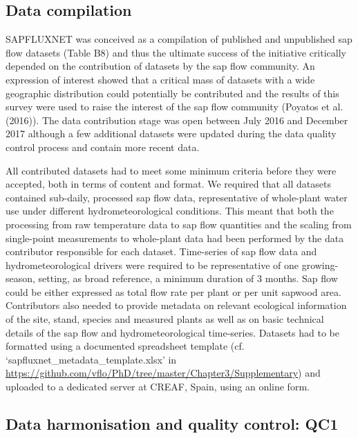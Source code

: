 \documentclass[11pt,twoside]{reedthesis}
\begin{document}
\subsection{Data compilation}\label{data-compilation}

SAPFLUXNET was conceived as a compilation of published and unpublished
sap flow datasets (Table B8) and thus the ultimate success of the
initiative critically depended on the contribution of datasets by the
sap flow community. An expression of interest showed that a critical
mass of datasets with a wide geographic distribution could potentially
be contributed and the results of this survey were used to raise the
interest of the sap flow community (Poyatos et al. (2016)). The data
contribution stage was open between July 2016 and December 2017 although
a few additional datasets were updated during the data quality control
process and contain more recent data. \par

All contributed datasets had to meet some minimum criteria before they
were accepted, both in terms of content and format. We required that all
datasets contained sub-daily, processed sap flow data, representative of
whole-plant water use under different hydrometeorological conditions.
This meant that both the processing from raw temperature data to sap
flow quantities and the scaling from single-point measurements to
whole-plant data had been performed by the data contributor responsible
for each dataset. Time-series of sap flow data and hydrometeorological
drivers were required to be representative of one growing-season,
setting, as broad reference, a minimum duration of 3 months. Sap flow
could be either expressed as total flow rate per plant or per unit
sapwood area. Contributors also needed to provide metadata on relevant
ecological information of the site, stand, species and measured plants
as well as on basic technical details of the sap flow and
hydrometeorological time-series. Datasets had to be formatted using a
documented spreadsheet template (cf.
`sapfluxnet\_metadata\_template.xlsx' in
\url{https://github.com/vflo/PhD/tree/master/Chapter3/Supplementary})
and uploaded to a dedicated server at CREAF, Spain, using an online
form.\par

\subsection{Data harmonisation and quality control:
QC1}\label{data-harmonisation-and-quality-control-qc1}
\end{document}
